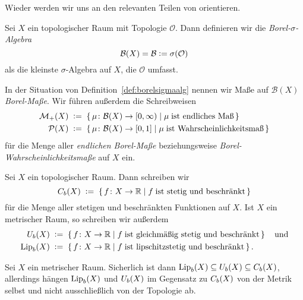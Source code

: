 \documentclass[../main/main.tex]{subfiles}
\begin{document}
	Wieder werden wir uns an den relevanten Teilen von \cite[Kapitel 4.14]{Simon.2015} orientieren.
	
	\begin{Definition}
		\label{def:borelsigmaalg}
		Sei $X$ ein topologischer Raum mit Topologie $\mathcal{O}$. Dann definieren wir die
		\emph{Borel-$\sigma$-Algebra} 
		$$\mathcal{B}(X) = \mathcal{B} \vcentcolon = \sigma(\mathcal{O})$$
		als die kleinste $\sigma$-Algebra auf $X$, die $\mathcal{O}$ umfasst.
	\end{Definition}

	\begin{Definition}
		In der Situation von Definition~\ref{def:borelsigmaalg} nennen wir Maße auf $\mathcal{B}(X)$ \emph{Borel-Maße}. Wir führen außerdem die Schreibweisen
		\begin{align*}
			\mathcal{M}_{+}(X)  \; &\vcentcolon = \; \left\{\, \mu \colon \mathcal{B}(X) \to [0,\infty) \; \middle| \; \mu \; 
				\text{ist endliches Maß} \,\right\} \\
			\mathcal{P}(X) \; &\vcentcolon = \; \left\{\, \mu \colon \mathcal{B}(X) \to [0,1] \; \middle| \; \mu \; 
				\text{ist Wahrscheinlichkeitsmaß} \,\right\}
		\end{align*}
		für die Menge aller \emph{endlichen Borel-Maße} beziehungsweise \emph{Borel-Wahrscheinlichkeitsmaße} auf $X$ ein.
	\end{Definition}
	
	\begin{Definition}
		Sei $X$ ein topologischer Raum. Dann schreiben wir
		\[ C_b(X) \; \vcentcolon = \; \left\{\, f \colon X \to \mathbb{R} \; \middle| \; f \; \text{ist stetig und beschränkt} \,\right\} \]
		für die Menge aller stetigen und beschränkten Funktionen auf $X$. 
		Ist $X$ ein metrischer Raum, so schreiben wir außerdem
		\begin{align*}
			U_b(X) \; &\vcentcolon = \; \left\{\, f \colon X \to \mathbb{R} \; \middle| \; f \; \text{ist gleichmäßig stetig und beschränkt} \,\right\} \quad \text{und} \\
			\mathrm{Lip}_b(X) \; &\vcentcolon = \; \left\{\, f \colon X \to \mathbb{R} \; \middle| \; f \; \text{ist lipschitzstetig und beschränkt} \,\right\} \text{.}
		\end{align*}
	\end{Definition}
	
	\begin{Bemerkung}
		Sei $X$ ein metrischer Raum. Sicherlich ist dann $\mathrm{Lip}_b(X) \subseteq U_b(X) \subseteq C_b(X)$, allerdings hängen $\mathrm{Lip}_b(X)$ und $U_b(X)$ im Gegensatz 
		zu $C_b(X)$ von der Metrik selbst und nicht ausschließlich von der Topologie ab.
	\end{Bemerkung}
	
\end{document}
